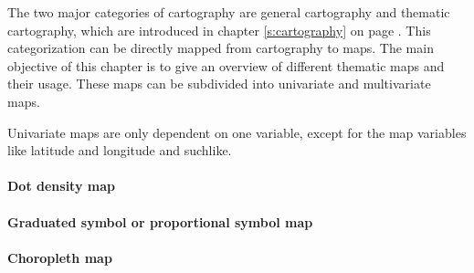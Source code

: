 The two major categories of cartography are general cartography and thematic cartography, which are introduced in chapter \ref{s:cartography} on page \pageref{s:cartography}. This categorization can be directly mapped from cartography to maps. The main objective of this chapter is to give an overview of different thematic maps and their usage. These maps can be subdivided into univariate and multivariate maps.

Univariate maps are only dependent on one variable, except for the map variables like latitude and longitude and suchlike.

\paragraph{Dot density map}


\paragraph{Graduated symbol or proportional symbol map}


\paragraph{Choropleth map}

\label{s:choropleth}

